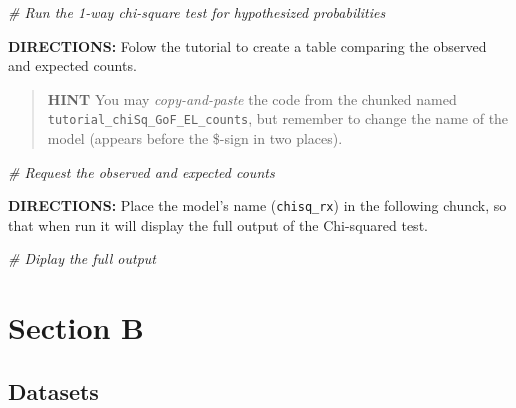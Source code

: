 \documentclass[
]{article}
\newenvironment{Shaded}{\begin{snugshade}}{\end{snugshade}}
\newcommand{\CommentTok}[1]{\textcolor[rgb]{0.56,0.35,0.01}{\textit{#1}}}
\begin{document}
\begin{Shaded}
\begin{Highlighting}[]
\CommentTok{\# Run the 1{-}way chi{-}square test for hypothesized probabilities}
\end{Highlighting}
\end{Shaded}

\textbf{DIRECTIONS:} Folow the tutorial to create a table comparing the
observed and expected counts.

\begin{quote}
\textbf{HINT} You may \emph{copy-and-paste} the code from the chunked
named \texttt{tutorial\_chiSq\_GoF\_EL\_counts}, but remember to change
the name of the model (appears before the \$-sign in two places).
\end{quote}

\begin{Shaded}
\begin{Highlighting}[]
\CommentTok{\# Request the observed and expected counts}
\end{Highlighting}
\end{Shaded}

\textbf{DIRECTIONS:} Place the model's name (\texttt{chisq\_rx}) in the
following chunck, so that when run it will display the full output of
the Chi-squared test.

\begin{Shaded}
\begin{Highlighting}[]
\CommentTok{\# Diplay the full output}
\end{Highlighting}
\end{Shaded}

\clearpage

\hypertarget{section-b}{%
\section{Section B}\label{section-b}}

\hypertarget{datasets-1}{%
\subsection{Datasets}\label{datasets-1}}
\end{document}
